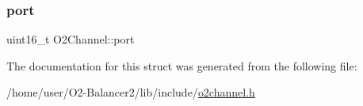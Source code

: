 \mbox{\label{structO2Channel_a68207433b6e0df1f34cbbf1bf68945ed}} 
\subsubsection{\texorpdfstring{port}{port}}
{\footnotesize\ttfamily uint16\+\_\+t O2\+Channel\+::port}



The documentation for this struct was generated from the following file\+:\begin{DoxyCompactItemize}
\item 
/home/user/\+O2-\/\+Balancer2/lib/include/\hyperlink{o2channel_8h}{o2channel.\+h}\end{DoxyCompactItemize}
